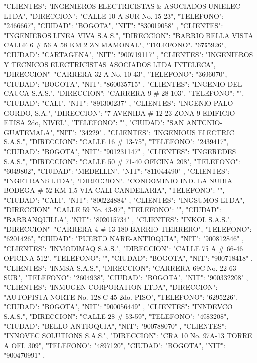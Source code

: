    {
   "CLIENTES": "INGENIEROS ELECTRICISTAS & ASOCIADOS UNIELEC LTDA",
   "DIRECCION": "CALLE 10 A SUR No. 15-23",
   "TELEFONO": "2466667",
   "CIUDAD": "BOGOTA",
   "NIT": "830019058"
   },
   {
   "CLIENTES": "INGENIEROS LINEA VIVA S.A.S.",
   "DIRECCION": "BARRIO BELLA VISTA CALLE 6 # 56 A 58 KM 2 ZN MAMONAL",
   "TELEFONO": "6765926",
   "CIUDAD": "CARTAGENA",
   "NIT": "900719117"
   },
   {
   "CLIENTES": "INGENIEROS Y TECNICOS ELECTRICISTAS ASOCIADOS LTDA INTELECA",
   "DIRECCION": "CARRERA 32 A No. 10-43",
   "TELEFONO": "3606070",
   "CIUDAD": "BOGOTA",
   "NIT": "860035715"
   },
   {
   "CLIENTES": "INGENIO DEL CAUCA S.A.S.",
   "DIRECCION": "CARRERA 9 # 28-103",
   "TELEFONO": "",
   "CIUDAD": "CALI",
   "NIT": "891300237"
   },
   {
   "CLIENTES": "INGENIO PALO GORDO, S.A.",
   "DIRECCION": "7 AVENIDA # 12-23 ZONA 9 EDIFICIO ETISA 2do, NIVEL",
   "TELEFONO": "",
   "CIUDAD": "SAN ANTONIO-GUATEMALA",
   "NIT": "34229"
   },
   {
   "CLIENTES": "INGENIOUS ELECTRIC S.A.S.",
   "DIRECCION": "CALLE 16 # 13-75",
   "TELEFONO": "2439417",
   "CIUDAD": "BOGOTA",
   "NIT": "901231147"
   },
   {
   "CLIENTES": "INGEREDES S.A.S.",
   "DIRECCION": "CALLE 50 # 71-40 OFICINA 208",
   "TELEFONO": "6049802",
   "CIUDAD": "MEDELLIN",
   "NIT": "811044490"
   },
   {
   "CLIENTES": "INGETRANS LTDA",
   "DIRECCION": "CONDOMINIO IND. LA NUBIA BODEGA # 52 KM 1,5 VIA CALI-CANDELARIA",
   "TELEFONO": "",
   "CIUDAD": "CALI",
   "NIT": "800224884"
   },
   {
   "CLIENTES": "INGSUMOS LTDA",
   "DIRECCION": "CALLE 59 No. 43-97",
   "TELEFONO": "",
   "CIUDAD": "BARRANQUILLA",
   "NIT": "802015734"
   },
   {
   "CLIENTES": "INKOL S.A.S.",
   "DIRECCION": "CARRERA 4 # 13-180 BARRIO TIERRERO",
   "TELEFONO": "6201426",
   "CIUDAD": "PUERTO NARE-ANTIOQUIA",
   "NIT": "900812846"
   },
   {
   "CLIENTES": "INMODIMAQ S.A.S.",
   "DIRECCION": "CALLE 75 A # 66-46 OFICINA 512",
   "TELEFONO": "",
   "CIUDAD": "BOGOTA",
   "NIT": "900718418"
   },
   {
   "CLIENTES": "INMSA S.A.S.",
   "DIRECCION": "CARRERA 69C No. 22-63 SUR",
   "TELEFONO": "2604938",
   "CIUDAD": "BOGOTA",
   "NIT": "900332208"
   },
   {
   "CLIENTES": "INMUGEN CORPORATION LTDA",
   "DIRECCION": "AUTOPISTA NORTE No. 128 C-45 2do. PISO",
   "TELEFONO": "6295226",
   "CIUDAD": "BOGOTA",
   "NIT": "900056449"
   },
   {
   "CLIENTES": "INNDEVCO S.A.S.",
   "DIRECCION": "CALLE 28 # 53-59",
   "TELEFONO": "4983208",
   "CIUDAD": "BELLO-ANTIOQUIA",
   "NIT": "900788070"
   },
   {
   "CLIENTES": "INNOVEC SOLUTIONS S.A.S.",
   "DIRECCION": "CRA 10 No. 97A-13 TORRE A OFI. 309",
   "TELEFONO": "4897120",
   "CIUDAD": "BOGOTA",
   "NIT": "900470991"
   },
